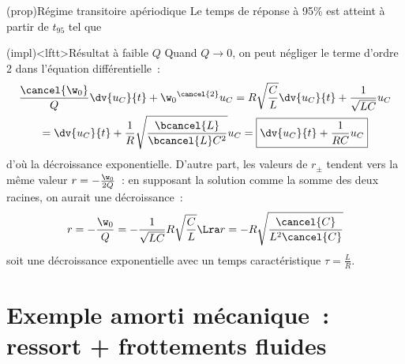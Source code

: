 \documentclass[../../main/main.tex]{subfiles}
\begin{document}
\begin{tcb*}[label=prop:transiaper](prop){Régime transitoire apériodique}
	Le temps de réponse à 95\% est atteint à partir de $t_{95}$ tel que
\end{tcb*}

\begin{tcb}[label=impl:aperpetitQ](impl)<lftt>{Résultat à faible $Q$}
	Quand $Q \longrightarrow 0$, on peut négliger le terme d'ordre 2 dans
	l'équation différentielle~:
	\begin{gather*}
		\frac{\cancel{\w_0}}{Q}\dv{u_C}{t} +
		\w_0{}^{\cancel{2}}u_C = R \sqrt{\frac{C}{L}} \dv{u_C}{t} +
		\frac{1}{\sqrt{LC}}u_C \\
		=
		\dv{u_C}{t} + \frac{1}{R}
		\sqrt{\frac{\bcancel{L}}{\bcancel{L}C^2}} u_C
		=
		\boxed{ \dv{u_C}{t} +
			\frac{1}{RC} u_C}
	\end{gather*}
	d'où la décroissance exponentielle. D'autre part, les valeurs de $r_\pm$
	tendent vers la même valeur $r = - \frac{\w_0}{2Q}$~: en supposant la solution
	comme la somme des deux racines, on aurait une décroissance~:
	\begin{gather*}
		r = -\frac{\w_0}{Q} = - \frac{1}{\sqrt{LC}}R
		\sqrt{\frac{C}{L}}
		\Lra
		r = -R \sqrt{\frac{\cancel{C}}{L^2\cancel{C}}}
	\end{gather*}
	soit une décroissance exponentielle avec un temps
	caractéristique $\tau = \frac{L}{R}$.
\end{tcb}

\vspace{-15pt}
\section{Exemple amorti mécanique~: ressort + frottements fluides}
\end{document}
